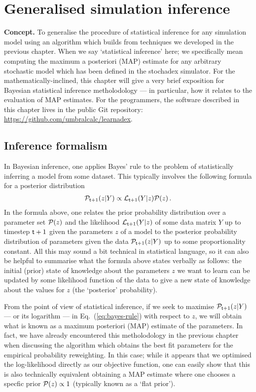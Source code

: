 \chapter{\sffamily Generalised simulation inference}

{\bfseries\sffamily Concept.} To generalise the procedure of statistical inference for any simulation model using an algorithm which builds from techniques we developed in the previous chapter. When we say `statistical inference' here; we specifically mean computing the maximum a posteriori (MAP) estimate for any arbitrary stochastic model which has been defined in the stochadex simulator. For the mathematically-inclined, this chapter will give a very brief exposition for Bayesian statistical inference metholodology --- in particular, how it relates to the evaluation of MAP estimates. For the programmers, the software described in this chapter lives in the public Git repository: \href{https://github.com/umbralcalc/learnadex}{https://github.com/umbralcalc/learnadex}.


\section{\sffamily Inference formalism}

In Bayesian inference, one applies Bayes' rule to the problem of statistically inferring a model from some dataset. This typically involves the following formula for a posterior distribution
\begin{align}
{\cal P}_{{\sf t}+1}(z \vert Y) \propto {\cal L}_{{\sf t}+1}(Y\vert z){\cal P} (z) \label{eq:bayes-rule} \,.
\end{align}
In the formula above, one relates the prior probability distribution over a parameter set ${\cal P} (z)$ and the likelihood ${\cal L}_{{\sf t}+1}(Y\vert z)$  of some data matrix $Y$ up to timestep ${\sf t}+1$ given the parameters $z$ of a model to the posterior probability distribution of parameters given the data ${\cal P}_{{\sf t}+1}(z \vert Y)$ up to some proportionality constant. All this may sound a bit technical in statistical language, so it can also be helpful to summarise what the formula above states verbally as follows: the initial (prior) state of knowledge about the parameters $z$ we want to learn can be updated by some likelihood function of the data to give a new state of knowledge about the values for $z$ (the `posterior' probability). 

From the point of view of statistical inference, if we seek to maximise ${\cal P}_{{\sf t}+1}(z \vert Y)$ --- or its logarithm --- in Eq.~(\ref{eq:bayes-rule}) with respect to $z$, we will obtain what is known as a maximum posteriori (MAP) estimate of the parameters. In fact, we have already encountered this metholodology in the previous chapter when discussing the algorithm which obtains the best fit parameters for the empirical probability reweighting. In this case; while it appears that we optimised the log-likelihood directly as our objective function, one can easily show that this is also technically equivalent obtaining a MAP estimate where one chooses a specfic prior ${\cal P} (z) \propto 1$ (typically known as a `flat prior').

